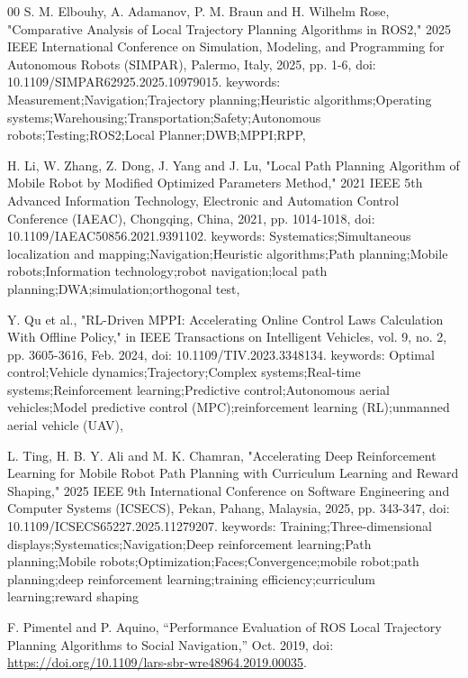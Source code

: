 \documentclass[conference]{IEEEtran}
\begin{document}
\newpage

\begin{thebibliography}{00}
 S. M. Elbouhy, A. Adamanov, P. M. Braun and H. Wilhelm Rose, "Comparative Analysis of Local Trajectory Planning Algorithms in ROS2," 2025 IEEE International Conference on Simulation, Modeling, and Programming for Autonomous Robots (SIMPAR), Palermo, Italy, 2025, pp. 1-6, doi: 10.1109/SIMPAR62925.2025.10979015.
keywords: {Measurement;Navigation;Trajectory planning;Heuristic algorithms;Operating systems;Warehousing;Transportation;Safety;Autonomous robots;Testing;ROS2;Local Planner;DWB;MPPI;RPP},

 H. Li, W. Zhang, Z. Dong, J. Yang and J. Lu, "Local Path Planning Algorithm of Mobile Robot by Modified Optimized Parameters Method," 2021 IEEE 5th Advanced Information Technology, Electronic and Automation Control Conference (IAEAC), Chongqing, China, 2021, pp. 1014-1018, doi: 10.1109/IAEAC50856.2021.9391102. keywords: {Systematics;Simultaneous localization and mapping;Navigation;Heuristic algorithms;Path planning;Mobile robots;Information technology;robot navigation;local path planning;DWA;simulation;orthogonal test},

 Y. Qu et al., "RL-Driven MPPI: Accelerating Online Control Laws Calculation With Offline Policy," in IEEE Transactions on Intelligent Vehicles, vol. 9, no. 2, pp. 3605-3616, Feb. 2024, doi: 10.1109/TIV.2023.3348134.
keywords: {Optimal control;Vehicle dynamics;Trajectory;Complex systems;Real-time systems;Reinforcement learning;Predictive control;Autonomous aerial vehicles;Model predictive control (MPC);reinforcement learning (RL);unmanned aerial vehicle (UAV)},

 L. Ting, H. B. Y. Ali and M. K. Chamran, "Accelerating Deep Reinforcement Learning for Mobile Robot Path Planning with Curriculum Learning and Reward Shaping," 2025 IEEE 9th International Conference on Software Engineering and Computer Systems (ICSECS), Pekan, Pahang, Malaysia, 2025, pp. 343-347, doi: 10.1109/ICSECS65227.2025.11279207. keywords: {Training;Three-dimensional displays;Systematics;Navigation;Deep reinforcement learning;Path planning;Mobile robots;Optimization;Faces;Convergence;mobile robot;path planning;deep reinforcement learning;training efficiency;curriculum learning;reward shaping}

 F. Pimentel and P. Aquino, “Performance Evaluation of ROS Local Trajectory Planning Algorithms to Social Navigation,” Oct. 2019, doi: \url{https://doi.org/10.1109/lars-sbr-wre48964.2019.00035}.  %


\end{thebibliography}
\end{document}

